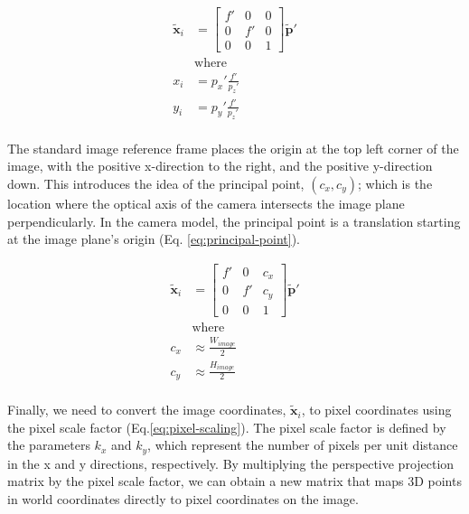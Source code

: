 \begin{equation}
    \begin{aligned}
        \tilde{\mathbf{x}}_{i} &= \begin{bmatrix}
            f' & 0 & 0 \\ 0 & f' & 0 \\ 0 & 0 & 1 
        \end{bmatrix} \tilde{\mathbf{p}}' \\
        &\text{where} \\
        x_i &= p_x'\frac{f'}{p_z'} \\
        y_i &= p_y'\frac{f'}{p_z'} \\
    \end{aligned}
    \label{eq:perspective-projection}
\end{equation}

The standard image reference frame places the origin at the top left corner of the image, with the positive x-direction to the right, and the positive y-direction down. This introduces the idea of the principal point, $(c_x,c_y)$; which is the location where the optical axis of the camera intersects the image plane perpendicularly. In the camera model, the principal point is a translation starting at the image plane's origin (Eq. \ref{eq:principal-point}).


\begin{equation}
    \begin{aligned}
        \tilde{\mathbf{x}}_{i} &= \begin{bmatrix}
            f' & 0 & c_x \\ 0 & f' & c_y \\ 0 & 0 & 1 
        \end{bmatrix} \tilde{\mathbf{p}}' \\
        &\text{where} \\
        c_x &\approx \frac{W_{image}}{2} \\
        c_y &\approx \frac{H_{image}}{2} \\
    \end{aligned}
    \label{eq:principal-point}
\end{equation}

Finally, we need to convert the image coordinates, $\tilde{\mathbf{x}}_i$, to pixel coordinates using the pixel scale factor (Eq.\ref{eq:pixel-scaling}). The pixel scale factor is defined by the parameters $k_x$ and $k_y$, which represent the number of pixels per unit distance in the x and y directions, respectively. By multiplying the perspective projection matrix by the pixel scale factor, we can obtain a new matrix that maps 3D points in world coordinates directly to pixel coordinates on the image.

